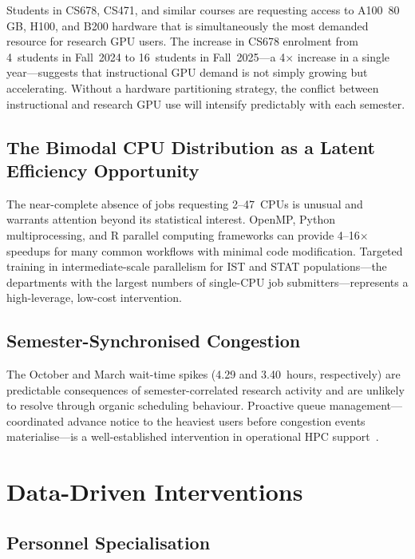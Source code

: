 \documentclass[11pt,letterpaper]{article}
\begin{document}
Students in CS678, CS471, and similar courses are requesting access to A100~80\,GB,
H100, and B200 hardware that is simultaneously the most demanded resource for
research GPU users.  The increase in CS678 enrolment from 4~students in
Fall~2024 to 16~students in Fall~2025---a 4$\times$ increase in a single
year---suggests that instructional GPU demand is not simply growing but
accelerating.  Without a hardware partitioning strategy, the conflict between
instructional and research GPU use will intensify predictably with each semester.

\subsection{The Bimodal CPU Distribution as a Latent Efficiency Opportunity}

The near-complete absence of jobs requesting 2--47~CPUs is unusual and warrants
attention beyond its statistical interest.  OpenMP, Python multiprocessing, and
R parallel computing frameworks can provide 4--16$\times$ speedups for many common
workflows with minimal code modification.  Targeted training in intermediate-scale
parallelism for IST and STAT populations---the departments with the largest
numbers of single-CPU job submitters---represents a high-leverage, low-cost
intervention.

\subsection{Semester-Synchronised Congestion}

The October and March wait-time spikes (4.29 and 3.40~hours, respectively) are
predictable consequences of semester-correlated research activity and are unlikely
to resolve through organic scheduling behaviour.  Proactive queue management---
coordinated advance notice to the heaviest users before congestion events
materialise---is a well-established intervention in operational HPC
support~\citep{ragavan2020}.

\section{Data-Driven Interventions}
\label{sec:interventions}

\subsection{Personnel Specialisation}
\end{document}
